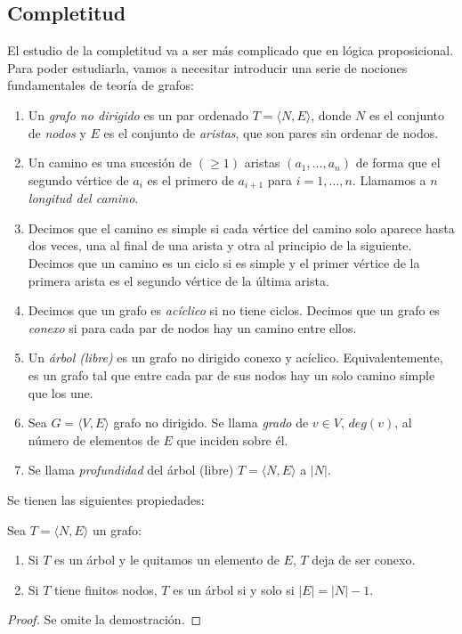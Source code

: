 \subsection{Completitud}

El estudio de la completitud va a ser más complicado que en lógica proposicional. Para poder estudiarla, vamos a necesitar introducir una serie de nociones fundamentales de teoría de grafos: 

\begin{defs}\mbox{}
\begin{enumerate}[label=\bold{\arabic*})]
    \item Un \textit{grafo no dirigido} es un par ordenado $T = \langle N, E \rangle$, donde $N$ es el conjunto de \textit{nodos} y $E$ es el conjunto de \textit{aristas}, que son pares sin ordenar de nodos.
    \item Un camino es una sucesión de $(\geq1)$ aristas $(a_1,\dots,a_n)$ de forma que el segundo vértice de $a_i$ es el primero de $a_{i+1}$ para $i=1,\dots,n$. Llamamos a $n$ \textit{longitud del camino}. 
    \item Decimos que el camino es simple si cada vértice del camino solo aparece hasta dos veces, una al final de una arista y otra al principio de la siguiente. Decimos que un camino es un ciclo si es simple y el primer vértice de la primera arista es el segundo vértice de la última arista.
    \item Decimos que un grafo es \textit{acíclico} si no tiene ciclos. Decimos que un grafo es \textit{conexo} si para cada par de nodos hay un camino entre ellos.
    \item Un \textit{árbol (libre)} es un grafo no dirigido conexo y acíclico. Equivalentemente, es un grafo tal que entre cada par de sus nodos hay un solo camino simple que los une.
    \item Sea $G = \langle V, E\rangle$ grafo no dirigido. Se llama \textit{grado} de $v \in V$, $deg(v)$, al número de elementos de $E$ que inciden sobre él.
    \item Se llama \textit{profundidad} del árbol (libre) $T = \langle N, E \rangle$ a $|N|$.
\end{enumerate}
\end{defs}


Se tienen las siguientes propiedades:

\begin{prop}
Sea $T = \langle N, E \rangle$ un grafo:
\begin{enumerate}
    \item Si $T$ es un árbol y le quitamos un elemento de $E$, $T$ deja de ser conexo.
    \item Si $T$ tiene finitos nodos, $T$ es un árbol si y solo si $|E| = |N| - 1$.
\end{enumerate}
\end{prop}
\begin{proof}
Se omite la demostración.
\end{proof}

